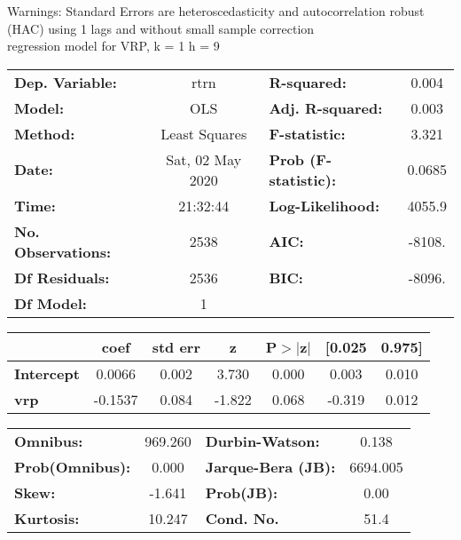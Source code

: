 Warnings: \newline
 [1] Standard Errors are heteroscedasticity and autocorrelation robust (HAC) using 1 lags and without small sample correction\\ 

regression model for VRP, k = 1 h = 9\begin{center}
\begin{tabular}{lclc}
\toprule
\textbf{Dep. Variable:}    &       rtrn       & \textbf{  R-squared:         } &     0.004   \\
\textbf{Model:}            &       OLS        & \textbf{  Adj. R-squared:    } &     0.003   \\
\textbf{Method:}           &  Least Squares   & \textbf{  F-statistic:       } &     3.321   \\
\textbf{Date:}             & Sat, 02 May 2020 & \textbf{  Prob (F-statistic):} &   0.0685    \\
\textbf{Time:}             &     21:32:44     & \textbf{  Log-Likelihood:    } &    4055.9   \\
\textbf{No. Observations:} &        2538      & \textbf{  AIC:               } &    -8108.   \\
\textbf{Df Residuals:}     &        2536      & \textbf{  BIC:               } &    -8096.   \\
\textbf{Df Model:}         &           1      & \textbf{                     } &             \\
\bottomrule
\end{tabular}
\begin{tabular}{lcccccc}
                   & \textbf{coef} & \textbf{std err} & \textbf{z} & \textbf{P$> |$z$|$} & \textbf{[0.025} & \textbf{0.975]}  \\
\midrule
\textbf{Intercept} &       0.0066  &        0.002     &     3.730  &         0.000        &        0.003    &        0.010     \\
\textbf{vrp}       &      -0.1537  &        0.084     &    -1.822  &         0.068        &       -0.319    &        0.012     \\
\bottomrule
\end{tabular}
\begin{tabular}{lclc}
\textbf{Omnibus:}       & 969.260 & \textbf{  Durbin-Watson:     } &    0.138  \\
\textbf{Prob(Omnibus):} &   0.000 & \textbf{  Jarque-Bera (JB):  } & 6694.005  \\
\textbf{Skew:}          &  -1.641 & \textbf{  Prob(JB):          } &     0.00  \\
\textbf{Kurtosis:}      &  10.247 & \textbf{  Cond. No.          } &     51.4  \\
\bottomrule
\end{tabular}
\end{center}

